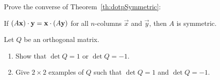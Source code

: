 \documentclass{ximera}
\begin{document}
\begin{problem}\label{ex:8_2_15}
Prove the converse of Theorem~\ref{th:dotpSymmetric}:

If $(A\mathbf{x}) \cdot \mathbf{y} = \mathbf{x} \cdot (A\mathbf{y})$ for all $n$-columns $\vec{x}$ and $\vec{y}$, then $A$ is symmetric.

\end{problem}



\begin{problem}\label{prob:ortho19}
Let $Q$ be an orthogonal matrix.

\begin{enumerate}
\item Show that $\det Q = 1$ or $\det Q = -1$.

\item Give $2 \times 2$ examples of $Q$ such that $\det Q = 1$ and $\det  Q = -1$.



\end{enumerate}


\end{problem}
\end{document}
